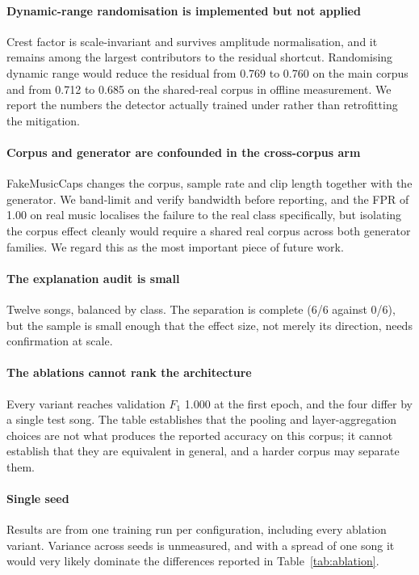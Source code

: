 \paragraph{Dynamic-range randomisation is implemented but not applied}
Crest factor is scale-invariant and survives amplitude normalisation, and it
remains among the largest contributors to the residual shortcut. Randomising
dynamic range would reduce the residual from 0.769 to 0.760 on the main corpus
and from 0.712 to 0.685 on the shared-real corpus in offline measurement. We
report the numbers the detector actually trained under rather than retrofitting
the mitigation.

\paragraph{Corpus and generator are confounded in the cross-corpus arm}
FakeMusicCaps changes the corpus, sample rate and clip length together with the
generator. We band-limit and verify bandwidth before reporting, and the FPR of
1.00 on real music localises the failure to the real class specifically, but
isolating the corpus effect cleanly would require a shared real corpus across
both generator families. We regard this as the most important piece of future
work.

\paragraph{The explanation audit is small}
Twelve songs, balanced by class. The separation is complete (6/6 against 0/6),
but the sample is small enough that the effect size, not merely its direction,
needs confirmation at scale.

\paragraph{The ablations cannot rank the architecture}
Every variant reaches validation $F_1$ 1.000 at the first epoch, and the four
differ by a single test song. The table establishes that the pooling and
layer-aggregation choices are not what produces the reported accuracy on this
corpus; it cannot establish that they are equivalent in general, and a harder
corpus may separate them.

\paragraph{Single seed}
Results are from one training run per configuration, including every ablation
variant. Variance across seeds is unmeasured, and with a spread of one song it
would very likely dominate the differences reported in
Table~\ref{tab:ablation}.

